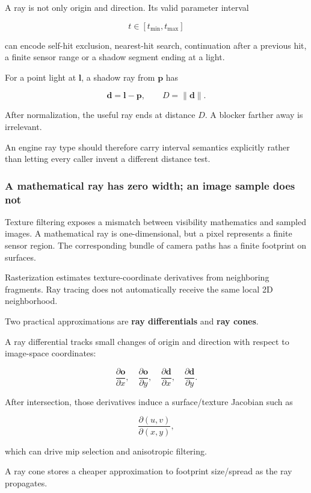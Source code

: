 A ray is not only origin and direction. Its valid parameter interval

\[
t\in[t_{\min},t_{\max}]
\]

can encode self-hit exclusion, nearest-hit search, continuation after a previous hit, a finite sensor range or a shadow segment ending at a light.

For a point light at \(\mathbf l\), a shadow ray from \(\mathbf p\) has

\[
\mathbf d=\mathbf l-\mathbf p,
\qquad
D=\|\mathbf d\|.
\]

After normalization, the useful ray ends at distance \(D\). A blocker farther away is irrelevant.

An engine ray type should therefore carry interval semantics explicitly rather than letting every caller invent a different distance test.

\subsubsection{A mathematical ray has zero width; an image sample does not}\label{03-visual-computing-i-ch001-a-mathematical-ray-has-zero-width-an-image-sample-does-not}

Texture filtering exposes a mismatch between visibility mathematics and sampled images. A mathematical ray is one-dimensional, but a pixel represents a finite sensor region. The corresponding bundle of camera paths has a finite footprint on surfaces.

Rasterization estimates texture-coordinate derivatives from neighboring fragments. Ray tracing does not automatically receive the same local 2D neighborhood.

Two practical approximations are \textbf{ray differentials} and \textbf{ray cones}.

A ray differential tracks small changes of origin and direction with respect to image-space coordinates:

\[
\frac{\partial \mathbf o}{\partial x},
\quad
\frac{\partial \mathbf o}{\partial y},
\quad
\frac{\partial \mathbf d}{\partial x},
\quad
\frac{\partial \mathbf d}{\partial y}.
\]

After intersection, those derivatives induce a surface/texture Jacobian such as

\[
\frac{\partial(u,v)}{\partial(x,y)},
\]

which can drive mip selection and anisotropic filtering.

A ray cone stores a cheaper approximation to footprint size/spread as the ray propagates.

